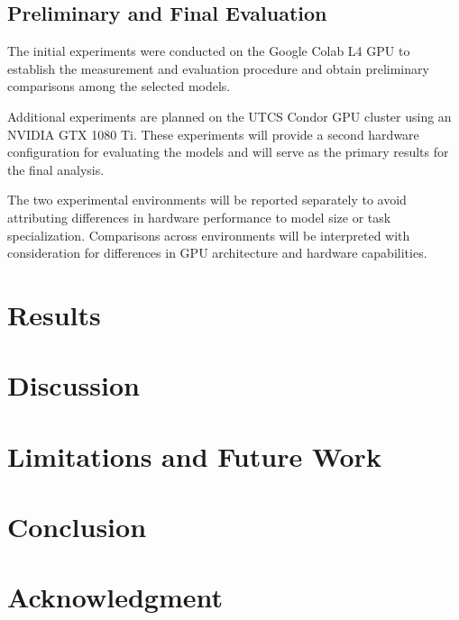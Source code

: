 \documentclass[conference]{IEEEtran}
\begin{document}
\subsection{Preliminary and Final Evaluation}

The initial experiments were conducted on the Google Colab L4 GPU
to establish the measurement and evaluation procedure and obtain
preliminary comparisons among the selected models.

Additional experiments are planned on the UTCS Condor GPU cluster
using an NVIDIA GTX 1080 Ti. These experiments will provide a second
hardware configuration for evaluating the models and will serve as
the primary results for the final analysis.

The two experimental environments will be reported separately to
avoid attributing differences in hardware performance to model size
or task specialization. Comparisons across environments will be
interpreted with consideration for differences in GPU architecture
and hardware capabilities.

\section{Results}

\section{Discussion}

\section{Limitations and Future Work}

\section{Conclusion}

\section*{Acknowledgment}
\end{document}
